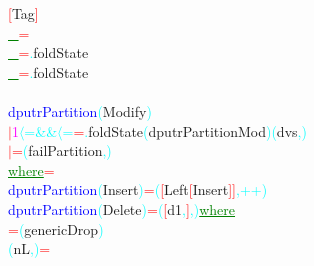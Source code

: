 {{\textcolor{red}{[}{\rm{}Tag}\textcolor{red}{]}\\\hsspace \textcolor{green}{\underline{\_}}\hsspace \textcolor{red}{=}\hsspace {\rm{}[]}\\\hsspace \textcolor{green}{\underline{\_}}\hsspace \textcolor{red}{=}\textcolor{cyan}{.}{\rm{}foldState}\\\hsspace \textcolor{green}{\underline{\_}}\hsspace \textcolor{red}{=}\textcolor{cyan}{.}{\rm{}foldState}\\\\\textcolor{blue}{dputrPartition}\hsspace \textcolor{cyan}{(}{\rm{}Modify}\textcolor{cyan}{)}\\\hstab \textcolor{red}{\ensuremath{|}}\hsspace \textcolor{magenta}{1}\hsspace \textcolor{cyan}{\ensuremath{\langle}=}\hsspace \textcolor{cyan}{\&\&}\hsspace \textcolor{cyan}{\ensuremath{\langle}=}\hsspace \textcolor{red}{=}\textcolor{cyan}{.}{\rm{}foldState}\hsspace \textcolor{cyan}{(}{\rm{}dputrPartitionMod}\textcolor{cyan}{)}\hsspace \textcolor{cyan}{(}{\rm{}dvs}\textcolor{cyan}{,}\textcolor{cyan}{)}\\\hstab \textcolor{red}{\ensuremath{|}}\hsspace \hsspace \hsspace \hsspace \hsspace \hsspace \hsspace \hsspace \textcolor{red}{=}\hsspace \textcolor{cyan}{(}{\rm{}failPartition}\textcolor{cyan}{,}\textcolor{cyan}{)}\\\hstab \textcolor{green}{\underline{where}}\hsspace \textcolor{red}{=}\\\textcolor{blue}{dputrPartition}\hsspace \textcolor{cyan}{(}{\rm{}Insert}\textcolor{cyan}{)}\hsspace \textcolor{red}{=}\hsspace \textcolor{cyan}{(}\textcolor{red}{[}{\rm{}Left}\hsspace \textcolor{red}{[}{\rm{}Insert}\textcolor{red}{]}\textcolor{red}{]}\textcolor{cyan}{,}\hsspace \textcolor{cyan}{++}\textcolor{cyan}{)}\\\textcolor{blue}{dputrPartition}\hsspace \textcolor{cyan}{(}{\rm{}Delete}\textcolor{cyan}{)}\hsspace \textcolor{red}{=}\hsspace \textcolor{cyan}{(}\textcolor{red}{[}{\rm{}d1}\textcolor{cyan}{,}\textcolor{red}{]}\textcolor{cyan}{,}\textcolor{cyan}{)}\hsspace \textcolor{green}{\underline{where}}\\\hsspace \hsspace \textcolor{red}{=}\hsspace \textcolor{cyan}{(}{\rm{}genericDrop}\textcolor{cyan}{)}\\\hstab \textcolor{cyan}{(}{\rm{}nL}\textcolor{cyan}{,}\textcolor{cyan}{)}\hsspace \textcolor{red}{=}\hsspace }}
